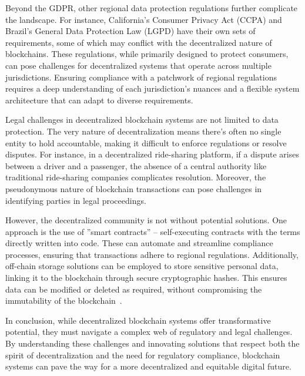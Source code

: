 Beyond the GDPR, other regional data protection regulations further complicate the landscape. For instance, California's Consumer Privacy Act (CCPA) and Brazil's General Data Protection Law (LGPD) have their own sets of requirements, some of which may conflict with the decentralized nature of blockchains. These regulations, while primarily designed to protect consumers, can pose challenges for decentralized systems that operate across multiple jurisdictions. Ensuring compliance with a patchwork of regional regulations requires a deep understanding of each jurisdiction's nuances and a flexible system architecture that can adapt to diverse requirements.

Legal challenges in decentralized blockchain systems are not limited to data protection. The very nature of decentralization means there's often no single entity to hold accountable, making it difficult to enforce regulations or resolve disputes. For instance, in a decentralized ride-sharing platform, if a dispute arises between a driver and a passenger, the absence of a central authority like traditional ride-sharing companies complicates resolution. Moreover, the pseudonymous nature of blockchain transactions can pose challenges in identifying parties in legal proceedings.

However, the decentralized community is not without potential solutions. One approach is the use of ''smart contracts'' – self-executing contracts with the terms directly written into code. These can automate and streamline compliance processes, ensuring that transactions adhere to regional regulations. Additionally, off-chain storage solutions can be employed to store sensitive personal data, linking it to the blockchain through secure cryptographic hashes. This ensures data can be modified or deleted as required, without compromising the immutability of the blockchain~\cite{Schwerin.2018}.

In conclusion, while decentralized blockchain systems offer transformative potential, they must navigate a complex web of regulatory and legal challenges. By understanding these challenges and innovating solutions that respect both the spirit of decentralization and the need for regulatory compliance, blockchain systems can pave the way for a more decentralized and equitable digital future.
